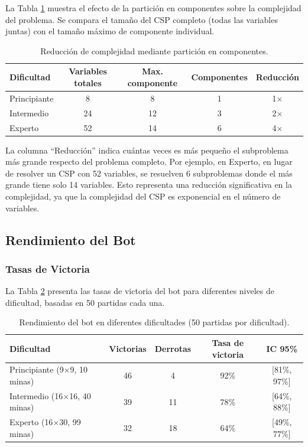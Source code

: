 \documentclass[12pt,a4paper]{article}
\begin{document}
La Tabla \ref{tab:particion} muestra el efecto de la partición en componentes sobre la complejidad del problema. Se compara el tamaño del CSP completo (todas las variables juntas) con el tamaño máximo de componente individual.

\begin{table}[H]
\centering
\caption{Reducción de complejidad mediante partición en componentes.}
\label{tab:particion}
\begin{tabular}{lcccc}
\toprule
\textbf{Dificultad} & \textbf{Variables totales} & \textbf{Max. componente} & \textbf{Componentes} & \textbf{Reducción} \\
\midrule
Principiante & 8 & 8 & 1 & 1$\times$ \\
Intermedio & 24 & 12 & 3 & 2$\times$ \\
Experto & 52 & 14 & 6 & 4$\times$ \\
\bottomrule
\end{tabular}
\end{table}

La columna ``Reducción'' indica cuántas veces es más pequeño el subproblema más grande respecto del problema completo. Por ejemplo, en Experto, en lugar de resolver un CSP con 52 variables, se resuelven 6 subproblemas donde el más grande tiene solo 14 variables. Esto representa una reducción significativa en la complejidad, ya que la complejidad del CSP es exponencial en el número de variables.

\subsection{Rendimiento del Bot}

\subsubsection{Tasas de Victoria}

La Tabla \ref{tab:bot_winrate} presenta las tasas de victoria del bot para diferentes niveles de dificultad, basadas en 50 partidas cada una.

\begin{table}[H]
\centering
\caption{Rendimiento del bot en diferentes dificultades (50 partidas por dificultad).}
\label{tab:bot_winrate}
\begin{tabular}{lcccc}
\toprule
\textbf{Dificultad} & \textbf{Victorias} & \textbf{Derrotas} & \textbf{Tasa de victoria} & \textbf{IC 95\%} \\
\midrule
Principiante (9$\times$9, 10 minas) & 46 & 4 & 92\% & [81\%, 97\%] \\
Intermedio (16$\times$16, 40 minas) & 39 & 11 & 78\% & [64\%, 88\%] \\
Experto (16$\times$30, 99 minas) & 32 & 18 & 64\% & [49\%, 77\%] \\
\bottomrule
\end{tabular}
\end{table}
\end{document}
